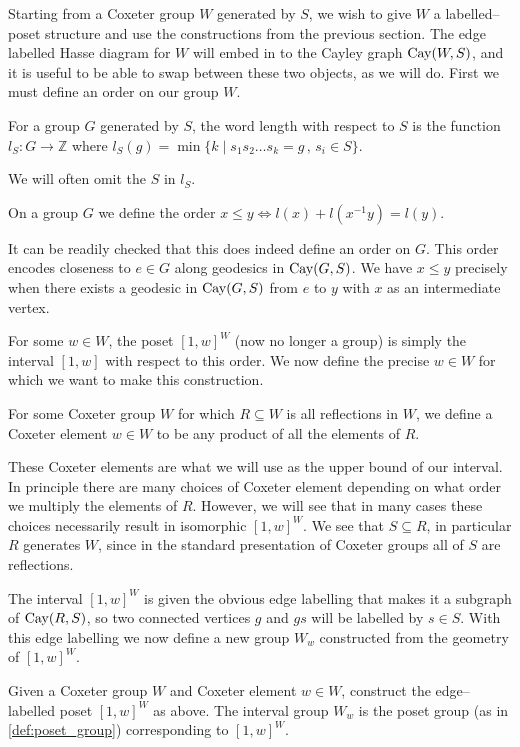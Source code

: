 \documentclass[class=article, crop=false]{standalone}
\begin{document}
Starting from a Coxeter group $W$ generated by $S$, we wish to give $W$ a labelled--poset structure and use the constructions from the previous section. The edge labelled Hasse diagram for $W$ will embed in to the Cayley graph $\text{Cay}(W,S)$, and it is useful to be able to swap between these two objects, as we will do. First we must define an order on our group $W$.
\begin{definition}
	For a group $G$ generated by $S$, the word length with respect to $S$ is the function $l_S:G\to \mathbb{Z}$ where $l_S(g) = \min\{k \mid s_1s_2\ldots s_k=g \,,\, s_i \in S \}$.
\end{definition}

We will often omit the $S$ in $l_S$.

\begin{definition}
	On a group $G$ we define the order $x \leq y \iff l(x) + l(x^{-1}y) = l(y)$.
\end{definition}

It can be readily checked that this does indeed define an order on $G$. This order encodes closeness to $e \in G$ along geodesics in $\text{Cay}(G,S)$. We have $x \leq y$ precisely when there exists a geodesic in $\text{Cay}(G, S)$ from $e$ to $y$ with $x$ as an intermediate vertex.

For some $w \in W$, the poset $[1,w]^W$ (now no longer a group) is simply the interval $[1,w]$ with respect to this order. We now define the precise $w \in W$ for which we want to make this construction.

\begin{definition}
	For some Coxeter group $W$ for which $R \subseteq W$ is all reflections in $W$, we define a Coxeter element $w\in W$ to be any product of all the elements of $R$.
\end{definition}

These Coxeter elements are what we will use as the upper bound of our interval. In principle there are many choices of Coxeter element depending on what order we multiply the elements of $R$. However, we will see that in many cases these choices necessarily result in isomorphic $[1,w]^W$. We see that $S \subseteq R$, in particular $R$ generates $W$, since in the standard presentation of Coxeter groups all of $S$ are reflections.

The interval $[1,w]^W$ is given the obvious edge labelling that makes it a subgraph of $\text{Cay}(R,S)$, so two connected vertices $g$ and $gs$ will be labelled by $s \in S$. With this edge labelling we now define a new group $W_w$ constructed from the geometry of $[1,w]^W$.

\begin{definition}
	Given a Coxeter group $W$ and Coxeter element $w\in W$, construct the edge--labelled poset $[1,w]^W$ as above. The interval group $W_w$ is the poset group (as in \cref{def:poset_group}) corresponding to $[1,w]^W$.
\end{definition}
\end{document}
